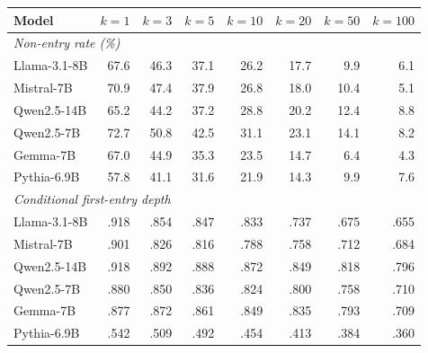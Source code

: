 \begin{tabular}{lrrrrrrr}
\toprule
Model & $k{=}1$ & $k{=}3$ & $k{=}5$ & $k{=}10$ & $k{=}20$ & $k{=}50$ & $k{=}100$ \\
\midrule
\multicolumn{8}{l}{\emph{Non-entry rate (\%)}} \\
Llama-3.1-8B & 67.6 & 46.3 & 37.1 & 26.2 & 17.7 & 9.9 & 6.1 \\
Mistral-7B & 70.9 & 47.4 & 37.9 & 26.8 & 18.0 & 10.4 & 5.1 \\
Qwen2.5-14B & 65.2 & 44.2 & 37.2 & 28.8 & 20.2 & 12.4 & 8.8 \\
Qwen2.5-7B & 72.7 & 50.8 & 42.5 & 31.1 & 23.1 & 14.1 & 8.2 \\
Gemma-7B & 67.0 & 44.9 & 35.3 & 23.5 & 14.7 & 6.4 & 4.3 \\
Pythia-6.9B & 57.8 & 41.1 & 31.6 & 21.9 & 14.3 & 9.9 & 7.6 \\
\midrule
\multicolumn{8}{l}{\emph{Conditional first-entry depth}} \\
Llama-3.1-8B & .918 & .854 & .847 & .833 & .737 & .675 & .655 \\
Mistral-7B & .901 & .826 & .816 & .788 & .758 & .712 & .684 \\
Qwen2.5-14B & .918 & .892 & .888 & .872 & .849 & .818 & .796 \\
Qwen2.5-7B & .880 & .850 & .836 & .824 & .800 & .758 & .710 \\
Gemma-7B & .877 & .872 & .861 & .849 & .835 & .793 & .709 \\
Pythia-6.9B & .542 & .509 & .492 & .454 & .413 & .384 & .360 \\
\bottomrule
\end{tabular}
